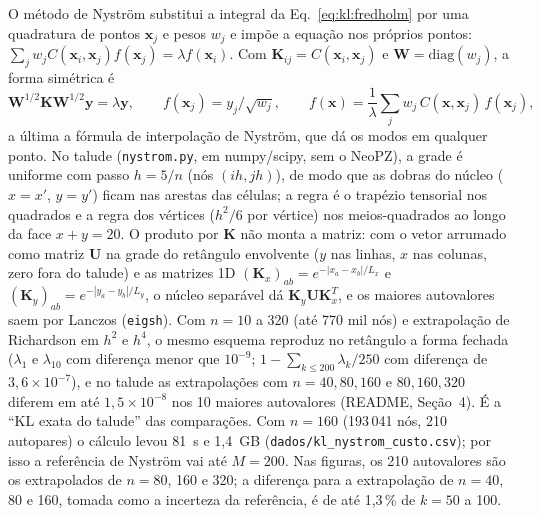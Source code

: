 O método de Nyström substitui a integral da Eq.~\eqref{eq:kl:fredholm} por uma quadratura de pontos $\mathbf{x}_j$ e
pesos $w_j$ e impõe a equação nos próprios pontos:
$\sum_j w_j C(\mathbf{x}_i, \mathbf{x}_j) f(\mathbf{x}_j) = \lambda f(\mathbf{x}_i)$. Com
$\mathbf{K}_{ij} = C(\mathbf{x}_i, \mathbf{x}_j)$ e $\mathbf{W} = \mathrm{diag}(w_j)$, a forma simétrica é
\begin{equation}
  \mathbf{W}^{1/2} \mathbf{K} \mathbf{W}^{1/2} \mathbf{y} = \lambda \mathbf{y}, \qquad
  f(\mathbf{x}_j) = y_j / \sqrt{w_j}, \qquad
  f(\mathbf{x}) = \frac{1}{\lambda} \sum_j w_j \, C(\mathbf{x}, \mathbf{x}_j) \, f(\mathbf{x}_j),
  \label{eq:kl:nystrom}
\end{equation}
a última a fórmula de interpolação de Nyström, que dá os modos em qualquer ponto. No talude (\texttt{nystrom.py}, em
numpy/scipy, sem o NeoPZ), a grade é uniforme com passo $h = 5/n$ (nós $(ih, jh)$), de modo que as dobras do núcleo
($x = x'$, $y = y'$) ficam nas arestas das células; a regra é o trapézio tensorial nos quadrados e a regra dos vértices
($h^2/6$ por vértice) nos meios-quadrados ao longo da face $x + y = 20$. O produto por $\mathbf{K}$ não monta a matriz:
com o vetor arrumado como matriz $\mathbf{U}$ na grade do retângulo envolvente ($y$ nas linhas, $x$ nas colunas, zero
fora do talude) e as matrizes 1D $(\mathbf{K}_x)_{ab} = e^{-|x_a - x_b|/L_x}$ e
$(\mathbf{K}_y)_{ab} = e^{-|y_a - y_b|/L_y}$, o núcleo separável dá $\mathbf{K}_y \mathbf{U} \mathbf{K}_x^T$, e os
maiores autovalores saem por Lanczos (\texttt{eigsh}). Com $n = 10$ a 320 (até 770 mil nós) e extrapolação de Richardson em
$h^2$ e $h^4$, o mesmo esquema reproduz no retângulo a forma fechada ($\lambda_1$ e $\lambda_{10}$ com diferença menor
que $10^{-9}$; $1 - \sum_{k \le 200} \lambda_k / 250$ com diferença de $3{,}6 \times 10^{-7}$), e no talude as
extrapolações com $n = 40, 80, 160$ e $80, 160, 320$ diferem em até $1{,}5 \times 10^{-8}$ nos 10 maiores autovalores
(README, Seção~4). É a ``KL exata do talude'' das comparações. Com $n = 160$ (193\,041 nós, 210 autopares) o cálculo levou
81~s e 1,4~GB (\texttt{dados/kl\_nystrom\_custo.csv}); por isso a referência de Nyström vai até $M = 200$. Nas figuras,
os 210 autovalores são os extrapolados de $n = 80$, 160 e 320; a diferença para a extrapolação de $n = 40$, 80 e 160,
tomada como a incerteza da referência, é de até 1,3\,\% de $k = 50$ a 100.
